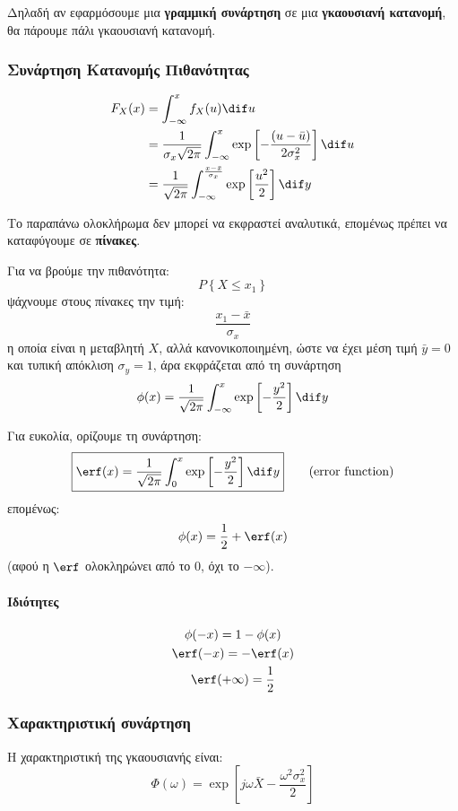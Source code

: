 \documentclass[11pt,a4paper,notitlepage,fleqn,final]{article}
\begin{document}
Δηλαδή αν εφαρμόσουμε μια \textbf{γραμμική συνάρτηση}
σε μια \textbf{γκαουσιανή κατανομή},
θα πάρουμε πάλι γκαουσιανή κατανομή.

\subsubsection{Συνάρτηση Κατανομής Πιθανότητας}
\begin{align*}
	F_X(x) &= \int_{-\infty}^{x} f_X(u)\dif u \\
	&= \frac{1}{\sigma_x \sqrt{2\pi}} \int_{-\infty}^{x} \exp \left[
	-\frac{(u-\bar u)}{2\sigma_x^2}
	\right] \dif u
	\\ &=
	\frac{1}{\sqrt{2\pi}} \int_{-\infty}^{\frac{x-\bar x}{\sigma_x}}
	\exp\left[\frac{u^2}{2}\right] \dif y
\end{align*}

Το παραπάνω ολοκλήρωμα δεν μπορεί να εκφραστεί αναλυτικά, επομένως πρέπει
να καταφύγουμε σε \textbf{πίνακες}.

Για να βρούμε την πιθανότητα:
\[
P \left\lbrace X \leq x_1 \right\rbrace
\]
ψάχνουμε στους πίνακες την τιμή:
\[
\boxed{\frac{x_1-\bar x}{\sigma_x}}
\]
η οποία είναι η μεταβλητή \( X \), αλλά κανονικοποιημένη, ώστε να έχει
μέση τιμή \( \bar y = 0 \) και τυπική απόκλιση \( \sigma_y = 1 \), άρα
εκφράζεται από τη συνάρτηση \[
\phi(x) = \frac{1}{\sqrt{2\pi}}
\int_{-\infty}^{x} \exp\left[-\frac{y^2}{2}\right]\dif y
 \]

Για ευκολία, ορίζουμε τη συνάρτηση:
\[
\boxed{
	\erf(x) = \frac{1}{\sqrt{2\pi}}
	\int_{0}^{x} \exp\left[-\frac{y^2}{2}\right]\dif y
	} \qquad \text{(error function)}
\]
επομένως:
\[
\phi(x) = \frac{1}{2} + \erf(x)
\]
(αφού η \( \erf \) ολοκληρώνει από το \( 0 \), όχι το
\( -\infty \)).

\paragraph{Ιδιότητες}
\begin{gather*}
	\phi(-x) = 1-\phi(x) \\
	\erf(-x) = -\erf(x) \\
	\erf(+\infty) = \frac{1}{2}
\end{gather*}

\subsubsection{Χαρακτηριστική συνάρτηση}
Η χαρακτηριστική της γκαουσιανής είναι:
\[
\Phi(\omega ) = \exp\left[
j\omega \bar X - \frac{\omega^2\sigma_x^2}{2}
\right]
\]
\end{document}
